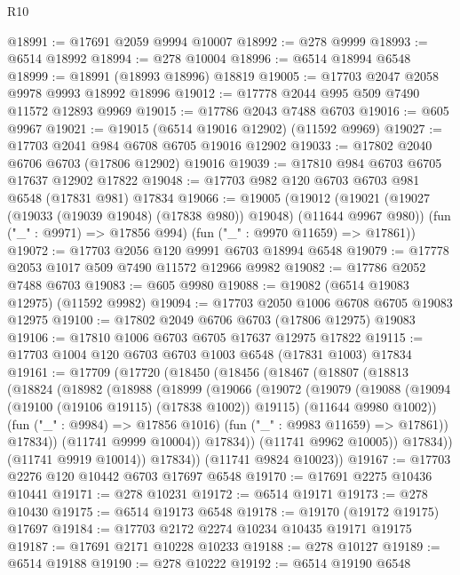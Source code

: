 \begin{lexlean}{R10}
\begin{coremodule}
{{{{{{{{{{{{{{{{{{{{{{{{{{{{{{{{{{{{{{{{{{{{{{{{{{{{{{{{{{{{{{{{{{{{{{{{{{{{{{{{{{{{@18991 := @17691 @2059 @9994 @10007
@18992 := @278 @9999
@18993 := @6514 @18992
@18994 := @278 @10004
@18996 := @6514 @18994 @6548
@18999 := @18991 (@18993 @18996) @18819
@19005 := @17703 @2047 @2058 @9978 @9993 @18992 @18996
@19012 := @17778 @2044 @995 @509 @7490 @11572 @12893 @9969
@19015 := @17786 @2043 @7488 @6703
@19016 := @605 @9967
@19021 := @19015 (@6514 @19016 @12902) (@11592 @9969)
@19027 := @17703 @2041 @984 @6708 @6705 @19016 @12902
@19033 := @17802 @2040 @6706 @6703 (@17806 @12902) @19016
@19039 := @17810 @984 @6703 @6705 @17637 @12902 @17822
@19048 := @17703 @982 @120 @6703 @6703 @981 @6548 (@17831 @981) @17834
@19066 := @19005
    (@19012
      (@19021 (@19027 (@19033 (@19039 @19048) (@17838 @980)) @19048) (@11644 @9967 @980))
      (fun ("_" : @9971) => @17856 @994)
      (fun ("_" : @9970 @11659) => @17861))
@19072 := @17703 @2056 @120 @9991 @6703 @18994 @6548
@19079 := @17778 @2053 @1017 @509 @7490 @11572 @12966 @9982
@19082 := @17786 @2052 @7488 @6703
@19083 := @605 @9980
@19088 := @19082 (@6514 @19083 @12975) (@11592 @9982)
@19094 := @17703 @2050 @1006 @6708 @6705 @19083 @12975
@19100 := @17802 @2049 @6706 @6703 (@17806 @12975) @19083
@19106 := @17810 @1006 @6703 @6705 @17637 @12975 @17822
@19115 := @17703 @1004 @120 @6703 @6703 @1003 @6548 (@17831 @1003) @17834
@19161 := @17709
    (@17720
      (@18450
        (@18456
          (@18467
            (@18807
              (@18813
                (@18824
                  (@18982
                    (@18988
                      (@18999
                        (@19066
                          (@19072
                            (@19079
                              (@19088
                                (@19094 (@19100 (@19106 @19115) (@17838 @1002)) @19115)
                                (@11644 @9980 @1002))
                              (fun ("_" : @9984) => @17856 @1016)
                              (fun ("_" : @9983 @11659) => @17861))
                            @17834))
                        (@11741 @9999 @10004))
                      @17834))
                  (@11741 @9962 @10005))
                @17834))
            (@11741 @9919 @10014))
          @17834))
      (@11741 @9824 @10023))
@19167 := @17703 @2276 @120 @10442 @6703 @17697 @6548
@19170 := @17691 @2275 @10436 @10441
@19171 := @278 @10231
@19172 := @6514 @19171
@19173 := @278 @10430
@19175 := @6514 @19173 @6548
@19178 := @19170 (@19172 @19175) @17697
@19184 := @17703 @2172 @2274 @10234 @10435 @19171 @19175
@19187 := @17691 @2171 @10228 @10233
@19188 := @278 @10127
@19189 := @6514 @19188
@19190 := @278 @10222
@19192 := @6514 @19190 @6548
}}}}}}}}}}}}}}}}}}}}}}}}}}}}}}}}}}}}}}}}}}}}}}}}}}}}}}}}}}}}}}}}}}}}}}}}}}}}}}}}}}}}
\end{coremodule}
\end{lexlean}
